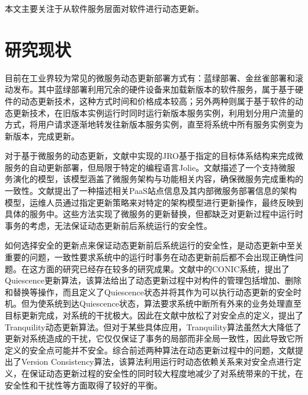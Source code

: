 \documentclass[macfonts,master]{njuthesis}
\begin{document}
\begin{spacing}{1.0}
\end{spacing}

本文主要关注于从软件服务层面对软件进行动态更新。

\section{研究现状}
目前在工业界较为常见的微服务动态更新部署方式有：蓝绿部署\cite{fowler2010bluegreendeployment}、金丝雀部署\cite{danilo2014canaryupdatestrategies,tarvo2015canaryadvisor}和滚动发布。其中蓝绿部署利用冗余的硬件设备来加载新版本的软件服务，属于基于硬件的动态更新技术，这种方式时间和价格成本较高；另外两种则属于基于软件的动态更新技术，在旧版本实例运行时同时运行新版本服务实例，利用划分用户流量的方式，将用户请求逐渐地转发往新版本服务实例，直至将系统中所有服务实例变为新版本，完成更新。

对于基于微服务的动态更新，文献\cite{gabbrielli2016self}中实现的JRO基于指定的目标体系结构来完成微服务的自动更新部署，但局限于特定的编程语言Jolie\cite{Jolie}。文献\cite{sampaio2017supporting}描述了一个支持微服务演化的模型，该模型涵盖了微服务架构与功能相关内容，确保微服务完成重构的一致性。文献\cite{boyer2018architecture}提出了一种描述相关PaaS站点信息及其内部微服务部署信息的架构模型，运维人员通过指定更新策略来对特定的架构模型进行更新操作，最终反映到具体的服务中。这些方法实现了微服务的更新替换，但都缺乏对更新过程中运行时事务的考虑，无法保证动态更新前后系统运行的安全性。

如何选择安全的更新点来保证动态更新前后系统运行的安全性，是动态更新中至关重要的问题，一致性要求系统中的运行时事务在动态更新前后都不会出现正确性问题\cite{segal1993fly}。在这方面的研究已经存在较多的研究成果。文献\cite{kramer1990evolving,magee1996dynamic}中的CONIC系统，提出了Quiescence更新算法，该算法给出了动态更新过程中对构件的管理包括增加、删除和替换等操作，而且定义了Quiescence状态并将其作为可以执行动态更新的安全时机。但为使系统到达Quiescence状态，算法要求系统中断所有外来的业务处理直至目标更新完成，对系统的干扰极大。因此在文献\cite{vandewoude2007tranquility}中放松了对安全点的定义，提出了Tranquility动态更新算法。但对于某些具体应用，Tranquility算法虽然大大降低了更新对系统造成的干扰，它仅仅保证了事务的局部而非全局一致性，因此导致它所定义的安全点可能并不安全。综合前述两种算法在动态更新过程中的问题，文献\cite{ma2011version,baresi2016efficient}提出了Version Consistency算法，该算法利用运行时动态依赖关系来对安全点进行定义，在保证动态更新过程的安全性的同时较大程度地减少了对系统带来的干扰，在安全性和干扰性等方面取得了较好的平衡。
\end{document}
